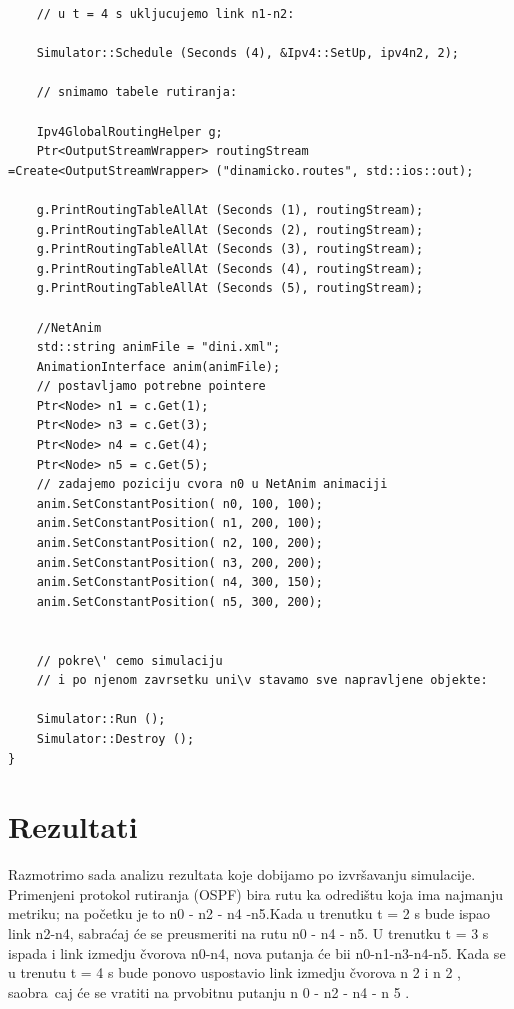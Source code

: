 \documentclass[a4paper,12pt, Projekat]{etf}
\begin{document}
\begin{itemize}
\begin{verbatim}
 	// u t = 4 s ukljucujemo link n1-n2:
	
	Simulator::Schedule (Seconds (4), &Ipv4::SetUp, ipv4n2, 2);

	// snimamo tabele rutiranja:

	Ipv4GlobalRoutingHelper g;
	Ptr<OutputStreamWrapper> routingStream =Create<OutputStreamWrapper> ("dinamicko.routes", std::ios::out);

	g.PrintRoutingTableAllAt (Seconds (1), routingStream);
	g.PrintRoutingTableAllAt (Seconds (2), routingStream);
	g.PrintRoutingTableAllAt (Seconds (3), routingStream);
	g.PrintRoutingTableAllAt (Seconds (4), routingStream);
	g.PrintRoutingTableAllAt (Seconds (5), routingStream);

	//NetAnim
	std::string animFile = "dini.xml";
	AnimationInterface anim(animFile);
	// postavljamo potrebne pointere
	Ptr<Node> n1 = c.Get(1);
	Ptr<Node> n3 = c.Get(3);
	Ptr<Node> n4 = c.Get(4);
	Ptr<Node> n5 = c.Get(5);
	// zadajemo poziciju cvora n0 u NetAnim animaciji
	anim.SetConstantPosition( n0, 100, 100);
	anim.SetConstantPosition( n1, 200, 100);
	anim.SetConstantPosition( n2, 100, 200);
	anim.SetConstantPosition( n3, 200, 200);
	anim.SetConstantPosition( n4, 300, 150);
	anim.SetConstantPosition( n5, 300, 200);
	
	
	// pokre\' cemo simulaciju
	// i po njenom zavrsetku uni\v stavamo sve napravljene objekte:

	Simulator::Run ();
	Simulator::Destroy ();
}
\end{verbatim}
\section{Rezultati}
Razmotrimo sada analizu rezultata koje dobijamo po izvr\v savanju simulacije.
Primenjeni protokol rutiranja (OSPF) bira rutu ka odredi\v stu koja ima najmanju metriku; na po\v cetku je to n0 - n2 - n4 -n5.Kada u trenutku t = 2 s bude ispao link n2-n4, sabra\' caj \' ce se preusmeriti na rutu n0 - n4 - n5. U trenutku t = 3 s ispada i link izmedju \v cvorova n0-n4, nova putanja \' ce bii n0-n1-n3-n4-n5. Kada se u trenutu t = 4 s bude ponovo uspostavio link izmedju \v cvorova n 2 i n 2 , saobra\ caj \' ce se vratiti na prvobitnu putanju n 0 - n2 - n4 - n 5 .


\end{itemize}
\end{document}
